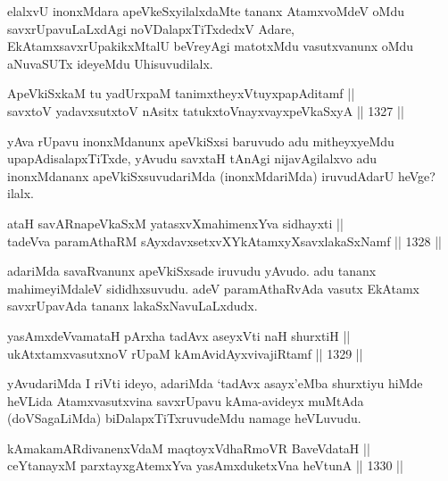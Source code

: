 \begin{artha}
elalxvU inonxMdara apeVkeSxyilalxdaMte tananx AtamxvoMdeV oMdu savxrUpavuLaLxdAgi noVDalapxTiTxdedxV Adare, EkAtamxsavxrUpakikxMtalU beVreyAgi matotxMdu vasutxvanunx oMdu aNuvaSUTx ideyeMdu Uhisuvudilalx.
\end{artha}


\begin{shl}
ApeVkiSxkaM tu yadUrxpaM tanimxtheyxVtuyxpapAditamf ||  \\
savxtoV yadavxsutxtoV nAsitx tatukxtoV\s nayxvayxpeVkaSxyA \hfill || 1327 ||  
\end{shl}

\begin{artha}
yAva rUpavu inonxMdanunx apeVkiSxsi baruvudo adu mitheyxyeMdu upapAdisalapxTiTxde, yAvudu savxtaH tAnAgi nijavAgilalxvo adu inonxMdananx apeVkiSxsuvudariMda (inonxMdariMda) iruvudAdarU heVge? ilalx.
\end{artha}

\begin{shl}
ataH savARnapeVkaSxM yatasxvXmahimenxYva sidhayxti || \\
tadeVva paramAthaRM sAyxdavxsetxvXYkAtamxyXsavxlakaSxNamf \hfill || 1328 ||  
\end{shl}

\begin{artha}
adariMda savaRvanunx apeVkiSxsade iruvudu yAvudo. adu tananx mahimeyiMdaleV sididhxsuvudu. adeV paramAthaRvAda vasutx EkAtamx savxrUpavAda tananx lakaSxNavuLaLxdudx.
\end{artha}

\begin{shl}
yasAmxdeVvamataH pArxha tadAvx aseyxVti naH shurxtiH || \\
ukAtxtamxvasutxnoV rUpaM kAmAvidAyxvivajiRtamf \hfill || 1329 ||  
\end{shl}

\begin{artha}
yAvudariMda I riVti ideyo, adariMda `tadAvx asayx'eMba shurxtiyu hiMde heVLida Atamxvasutxvina savxrUpavu kAma-avideyx muMtAda (doVSagaLiMda) biDalapxTiTxruvudeMdu namage heVLuvudu.
\end{artha}


\begin{shl}
kAmakamARdivanenxVdaM maqtoyxVdhaRmoVR BaveVdataH || \\
ceYtanayxM parxtayxgAtemxYva yasAmxduketxVna heVtunA \hfill || 1330 ||  
\end{shl}

